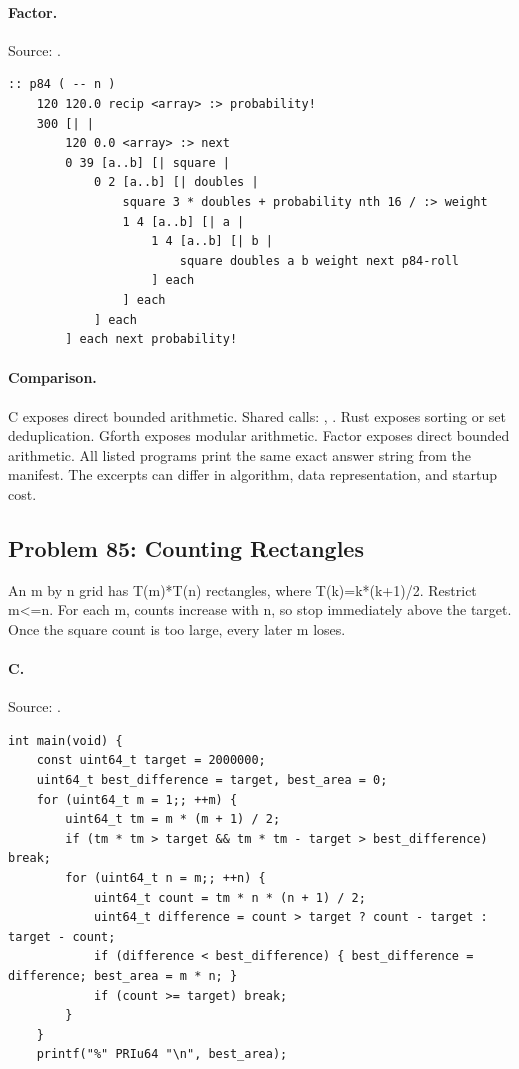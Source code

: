 \paragraph{Factor.} Source: .
\begin{lstlisting}
:: p84 ( -- n )
    120 120.0 recip <array> :> probability!
    300 [| |
        120 0.0 <array> :> next
        0 39 [a..b] [| square |
            0 2 [a..b] [| doubles |
                square 3 * doubles + probability nth 16 / :> weight
                1 4 [a..b] [| a |
                    1 4 [a..b] [| b |
                        square doubles a b weight next p84-roll
                    ] each
                ] each
            ] each
        ] each next probability!
\end{lstlisting}

\paragraph{Comparison.}
C exposes direct bounded arithmetic. Shared calls: \texttt{}, \texttt{}. Rust exposes sorting or set deduplication. Gforth exposes modular arithmetic. Factor exposes direct bounded arithmetic.
All listed programs print the same exact answer string from the manifest. The excerpts can differ in algorithm, data representation, and startup cost.

\subsection{Problem 85: Counting Rectangles}
\label{walkthrough:p85}
An m by n grid has T(m)*T(n) rectangles, where T(k)=k*(k+1)/2. Restrict m<=n. For each m, counts increase with n, so stop immediately above the target. Once the square count is too large, every later m loses.

\paragraph{C.} Source: .
\begin{lstlisting}
int main(void) {
    const uint64_t target = 2000000;
    uint64_t best_difference = target, best_area = 0;
    for (uint64_t m = 1;; ++m) {
        uint64_t tm = m * (m + 1) / 2;
        if (tm * tm > target && tm * tm - target > best_difference) break;
        for (uint64_t n = m;; ++n) {
            uint64_t count = tm * n * (n + 1) / 2;
            uint64_t difference = count > target ? count - target : target - count;
            if (difference < best_difference) { best_difference = difference; best_area = m * n; }
            if (count >= target) break;
        }
    }
    printf("%" PRIu64 "\n", best_area);
\end{lstlisting}

